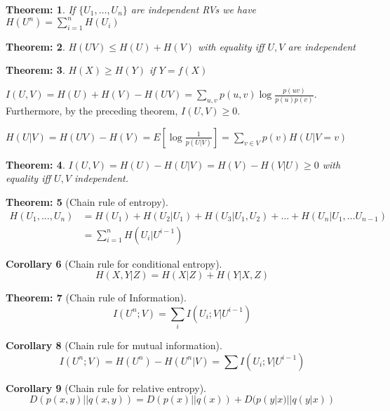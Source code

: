 \documentclass[11pt, a4paper]{scrartcl}
\newtheorem{theorem}{Theorem:}[section]
\newtheorem{corollary}[theorem]{Corollary}
\newenvironment{definition}[1][Definition]{\begin{trivlist}
\item[\hskip \labelsep {\bfseries #1}]}{\end{trivlist}}
\begin{document}
\begin{theorem}
  If $\{U_1,\dots,U_n\}$ are independent RVs we have $H(U^n)=\sum_{i=1}^nH(U_i)$
\end{theorem}

\begin{theorem}
  $H(UV)\leq H(U)+H(V)$ with equality iff $U,V$ are independent
\end{theorem}

\begin{theorem}
  $H(X)\geq H(Y)$ if $Y=f(X)$
\end{theorem}


\begin{definition} [Mutual Information]
$I(U,V)=H(U)+H(V)-H(UV)=\sum_{u,v} p(u,v)\log \frac{p(uv)}{p(u)p(v)}$. Furthermore, by the
preceding theorem, $I(U,V)\geq 0$.
\end{definition}

\begin{definition}[Conditional Entropy]
 $H(U|V)=H(UV)-H(V)=E\left[\log
  \frac{1}{p(U|V)}\right]=\sum_{v\in V}p(v)H(U|V=v)$
\end{definition}

\begin{theorem}
  $I(U,V)=H(U)-H(U|V)=H(V)-H(V|U) \geq 0$ with equality iff $U,V$ independent.
\end{theorem}

\begin{theorem} [Chain rule of entropy]
 \begin{align*}
 H(U_1,\dots ,U_n)&=H(U_1)+H(U_2|U_1)+H(U_3|U_1,U_2)+\dots
  +H(U_n|U_1,\dots U_{n-1})\\
  &= \sum_{i=1}^n H(U_i | U^{i-1})
  \end{align*}
\end{theorem}

\begin{corollary} [Chain rule for conditional entropy]
$$  H(X,Y|Z)=H(X|Z)+H(Y|X,Z)$$
\end{corollary}


\begin{theorem}[Chain rule of Information]
 $$I(U^n;V)=\sum_i I(U_i; V|U^{i-1})$$ 
\end{theorem}


\begin{corollary} [Chain rule for mutual information]
$$I(U^n; V)=H(U^n)-H(U^n|V)=\sum I(U_i; V|U^{i-1})$$
\end{corollary}

\begin{corollary}[Chain rule for relative entropy]
$$D(p(x,y)||q(x,y)) = D(p(x)||q(x)) + D(p(y|x)||q(y|x))  $$
\end{corollary}
\end{document}
